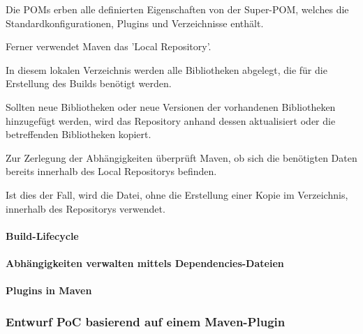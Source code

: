 Die POMs erben alle definierten Eigenschaften von der Super-POM, welches die Standardkonfigurationen, Plugins und Verzeichnisse enthält. 

Ferner verwendet Maven das 'Local Repository'. 

In diesem lokalen Verzeichnis werden alle Bibliotheken abgelegt, die für die Erstellung des Builds benötigt werden. 

Sollten neue Bibliotheken oder neue Versionen der vorhandenen Bibliotheken hinzugefügt werden, wird das Repository anhand dessen aktualisiert oder die betreffenden Bibliotheken kopiert. 

Zur Zerlegung der Abhängigkeiten überprüft Maven, ob sich die benötigten Daten bereits innerhalb des Local Repositorys befinden. 

Ist dies der Fall, wird die Datei, ohne die Erstellung einer Kopie im Verzeichnis, innerhalb des Repositorys verwendet.











\paragraph{Build-Lifecycle}

\paragraph{Abhängigkeiten verwalten mittels Dependencies-Dateien}

\paragraph{Plugins in Maven}

\subsubsection{Entwurf PoC basierend auf einem Maven-Plugin}



